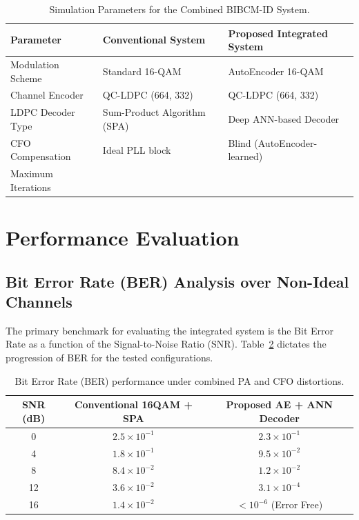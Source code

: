 \documentclass[a4paper,14pt]{extreport}
\begin{document}
\begin{table}[H]
    \centering
    \small
    \caption{Simulation Parameters for the Combined BIBCM-ID System.}
    \label{tab:ch5_params}
    \begin{tabularx}{\textwidth}{l >{\centering\arraybackslash}X >{\centering\arraybackslash}X}
        \toprule
        \textbf{Parameter} & \textbf{Conventional System} & \textbf{Proposed Integrated System} \\
        \midrule
        Modulation Scheme & Standard 16-QAM & AutoEncoder 16-QAM \\
        Channel Encoder & QC-LDPC (664, 332) & QC-LDPC (664, 332) \\
        LDPC Decoder Type & Sum-Product Algorithm (SPA) & Deep ANN-based Decoder \\
        CFO Compensation & Ideal PLL block & Blind (AutoEncoder-learned) \\
        Maximum Iterations & 20 & 10 \\
        \bottomrule
    \end{tabularx}
\end{table}

\section{Performance Evaluation}

\subsection{Bit Error Rate (BER) Analysis over Non-Ideal Channels}

The primary benchmark for evaluating the integrated system is the Bit Error Rate as a function of the Signal-to-Noise Ratio (SNR). Table~\ref{tab:ch5_ber} dictates the progression of BER for the tested configurations.

\begin{table}[H]
    \centering
    \caption{Bit Error Rate (BER) performance under combined PA and CFO distortions.}
    \label{tab:ch5_ber}
    \begin{tabular}{ccc}
        \toprule
        \textbf{SNR (dB)} & \textbf{Conventional 16QAM + SPA} & \textbf{Proposed AE + ANN Decoder} \\
        \midrule
        0 & $2.5 \times 10^{-1}$ & $2.3 \times 10^{-1}$ \\
        4 & $1.8 \times 10^{-1}$ & $9.5 \times 10^{-2}$ \\
        8 & $8.4 \times 10^{-2}$ & $1.2 \times 10^{-2}$ \\
        12 & $3.6 \times 10^{-2}$ & $3.1 \times 10^{-4}$ \\
        16 & $1.4 \times 10^{-2}$ & $< 10^{-6}$ (Error Free) \\
        \bottomrule
    \end{tabular}
\end{table}
\end{document}
